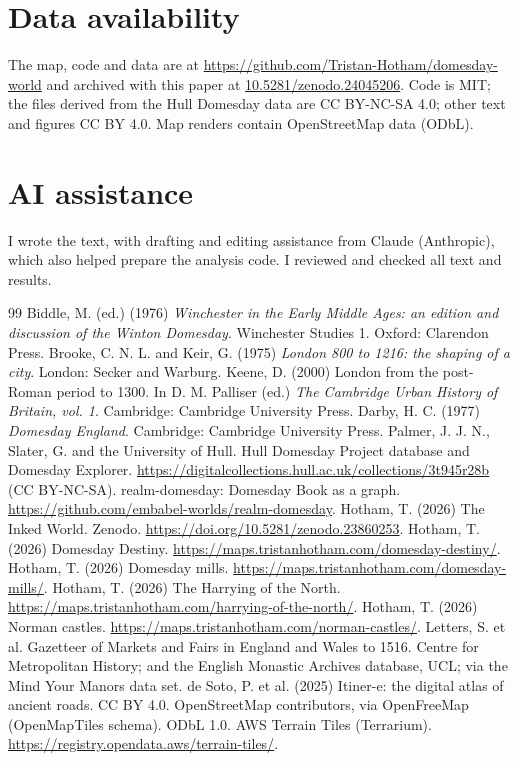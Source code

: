 \documentclass[11pt,a4paper]{article}
\begin{document}
\section{Data availability}
The map, code and data are at \url{https://github.com/Tristan-Hotham/domesday-world} and archived with this paper at \href{https://doi.org/10.5281/zenodo.24045206}{10.5281/zenodo.24045206}. Code is MIT; the files derived from the Hull Domesday data are CC BY-NC-SA 4.0; other text and figures CC BY 4.0. Map renders contain OpenStreetMap data (ODbL).

\section*{AI assistance}
I wrote the text, with drafting and editing assistance from Claude (Anthropic), which also helped prepare the analysis code. I reviewed and checked all text and results.

\begin{thebibliography}{99}
 Biddle, M. (ed.) (1976) \emph{Winchester in the Early Middle Ages: an edition and discussion of the Winton Domesday}. Winchester Studies 1. Oxford: Clarendon Press.
 Brooke, C. N. L. and Keir, G. (1975) \emph{London 800 to 1216: the shaping of a city}. London: Secker and Warburg.
 Keene, D. (2000) London from the post-Roman period to 1300. In D. M. Palliser (ed.) \emph{The Cambridge Urban History of Britain, vol. 1}. Cambridge: Cambridge University Press.
 Darby, H. C. (1977) \emph{Domesday England}. Cambridge: Cambridge University Press.
 Palmer, J. J. N., Slater, G. and the University of Hull. Hull Domesday Project database and Domesday Explorer. \url{https://digitalcollections.hull.ac.uk/collections/3t945r28b} (CC BY-NC-SA).
 realm-domesday: Domesday Book as a graph. \url{https://github.com/embabel-worlds/realm-domesday}.
 Hotham, T. (2026) The Inked World. Zenodo. \url{https://doi.org/10.5281/zenodo.23860253}.
 Hotham, T. (2026) Domesday Destiny. \url{https://maps.tristanhotham.com/domesday-destiny/}.
 Hotham, T. (2026) Domesday mills. \url{https://maps.tristanhotham.com/domesday-mills/}.
 Hotham, T. (2026) The Harrying of the North. \url{https://maps.tristanhotham.com/harrying-of-the-north/}.
 Hotham, T. (2026) Norman castles. \url{https://maps.tristanhotham.com/norman-castles/}.
 Letters, S. et al. Gazetteer of Markets and Fairs in England and Wales to 1516. Centre for Metropolitan History; and the English Monastic Archives database, UCL; via the Mind Your Manors data set.
 de Soto, P. et al. (2025) Itiner-e: the digital atlas of ancient roads. CC BY 4.0.
 OpenStreetMap contributors, via OpenFreeMap (OpenMapTiles schema). ODbL 1.0.
 AWS Terrain Tiles (Terrarium). \url{https://registry.opendata.aws/terrain-tiles/}.
\end{thebibliography}
\end{document}
